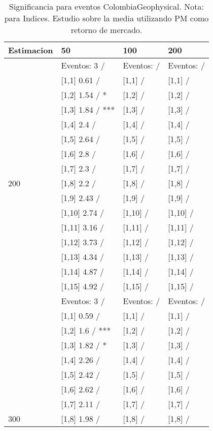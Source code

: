 \begin{table}

\caption{Significancia para eventos ColombiaGeophysical. Nota: para Indices. Estudio sobre la media utilizando PM como retorno de mercado.}
\centering
\begin{tabular}[t]{llll}
\toprule
Estimacion & 50 & 100 & 200\\
\midrule
 & Eventos:  3 / & Eventos:   / & Eventos:   /\\
 & {}[1,1] 0.61  / & {}[1,1]  / & {}[1,1]  /\\
 & {}[1,2] 1.54  / * & {}[1,2]  / & {}[1,2]  /\\
 & {}[1,3] 1.84  / *** & {}[1,3]  / & {}[1,3]  /\\
 & {}[1,4] 2.4  / & {}[1,4]  / & {}[1,4]  /\\
\addlinespace
 & {}[1,5] 2.64  / & {}[1,5]  / & {}[1,5]  /\\
 & {}[1,6] 2.8  / & {}[1,6]  / & {}[1,6]  /\\
 & {}[1,7] 2.3  / & {}[1,7]  / & {}[1,7]  /\\
200 & {}[1,8] 2.2  / & {}[1,8]  / & {}[1,8]  /\\
 & {}[1,9] 2.43  / & {}[1,9]  / & {}[1,9]  /\\
\addlinespace
 & {}[1,10] 2.74  / & {}[1,10]  / & {}[1,10]  /\\
 & {}[1,11] 3.16  / & {}[1,11]  / & {}[1,11]  /\\
 & {}[1,12] 3.73  / & {}[1,12]  / & {}[1,12]  /\\
 & {}[1,13] 4.34  / & {}[1,13]  / & {}[1,13]  /\\
 & {}[1,14] 4.87  / & {}[1,14]  / & {}[1,14]  /\\
\addlinespace
 & {}[1,15] 4.92  / & {}[1,15]  / & {}[1,15]  /\\
 & Eventos:  3 / & Eventos:   / & Eventos:   /\\
 & {}[1,1] 0.59  / & {}[1,1]  / & {}[1,1]  /\\
 & {}[1,2] 1.6  / *** & {}[1,2]  / & {}[1,2]  /\\
 & {}[1,3] 1.82  / * & {}[1,3]  / & {}[1,3]  /\\
\addlinespace
 & {}[1,4] 2.26  / & {}[1,4]  / & {}[1,4]  /\\
 & {}[1,5] 2.42  / & {}[1,5]  / & {}[1,5]  /\\
 & {}[1,6] 2.62  / & {}[1,6]  / & {}[1,6]  /\\
 & {}[1,7] 2.11  / & {}[1,7]  / & {}[1,7]  /\\
300 & {}[1,8] 1.98  / & {}[1,8]  / & {}[1,8]  /\\

\end{tabular}
\end{table}
